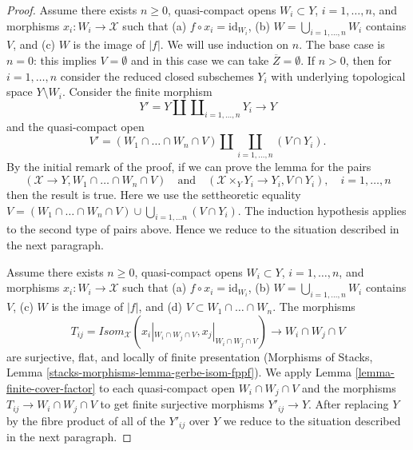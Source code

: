 \begin{proof}
\medskip\noindent
Assume there exists $n \geq 0$, quasi-compact opens
$W_i \subset Y$, $i = 1, \ldots, n$, and
morphisms $x_i : W_i \to \mathcal{X}$ such that
(a) $f \circ x_i = \text{id}_{W_i}$,
(b) $W = \bigcup_{i = 1, \ldots, n} W_i$ contains $V$, and
(c) $W$ is the image of $|f|$.
We will use induction on $n$. The base case is $n = 0$: this
implies $V = \emptyset$ and in this case we can take
$\overline{Z} = \emptyset$.
If $n > 0$, then for $i = 1, \ldots, n$
consider the reduced closed subschemes
$Y_i$ with underlying topological space
$Y \setminus W_i$. Consider the finite morphism
$$
Y' = Y \amalg \coprod\nolimits_{i = 1, \ldots, n} Y_i \longrightarrow Y
$$
and the quasi-compact open
$$
V' = (W_1 \cap \ldots \cap W_n \cap V) \amalg
\coprod_{i = 1, \ldots, n} (V \cap Y_i).
$$
By the initial remark of the proof, if we can prove the lemma for the pairs
$$
(\mathcal{X} \to Y, W_1 \cap \ldots \cap W_n \cap V)
\quad\text{and}\quad
(\mathcal{X} \times_Y Y_i \to Y_i, V \cap Y_i),\quad
i = 1, \ldots, n
$$
then the result is true. Here we use the settheoretic equality
$V = (W_1 \cap \ldots \cap W_n \cap V) \cup
\bigcup\nolimits_{i = 1, \ldots n} (V \cap Y_i)$.
The induction hypothesis applies to the second type of
pairs above. Hence we reduce to the situation described in
the next paragraph.

\medskip\noindent
Assume there exists $n \geq 0$, quasi-compact opens
$W_i \subset Y$, $i = 1, \ldots, n$, and
morphisms $x_i : W_i \to \mathcal{X}$ such that
(a) $f \circ x_i = \text{id}_{W_i}$,
(b) $W = \bigcup_{i = 1, \ldots, n} W_i$ contains $V$,
(c) $W$ is the image of $|f|$, and
(d) $V \subset W_1 \cap \ldots \cap W_n$.
The morphisms
$$
T_{ij} = \mathit{Isom}_\mathcal{X}(x_i|_{W_i \cap W_j \cap V},
x_j|_{W_i \cap W_j \cap V}) \longrightarrow W_i \cap W_j \cap V
$$
are surjective, flat, and locally of finite presentation
(Morphisms of Stacks, Lemma \ref{stacks-morphisms-lemma-gerbe-isom-fppf}).
We apply Lemma \ref{lemma-finite-cover-factor}
to each quasi-compact open $W_i \cap W_j \cap V$ and the morphisms
$T_{ij} \to W_i \cap W_j \cap V$ to get finite surjective morphisms
$Y'_{ij} \to Y$. After replacing $Y$ by the fibre product of all
of the $Y'_{ij}$ over $Y$ we reduce to the situation described
in the next paragraph.


\end{proof}
